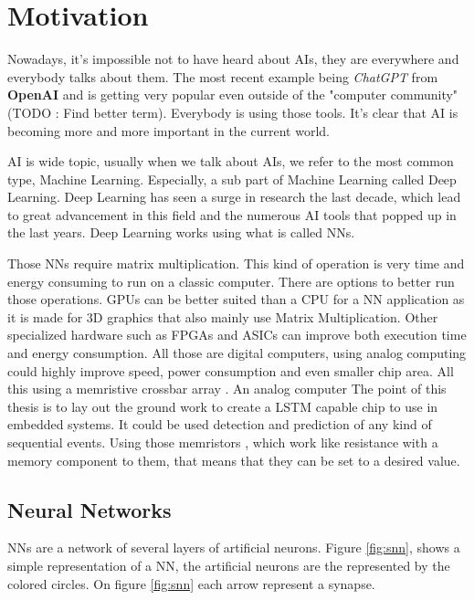 \section{Motivation}
\label{sec:int_motivation}

Nowadays, it's impossible not to have heard about \acp{AI}, they are everywhere and everybody talks about them. The most recent example being \textit{ChatGPT} from \textbf{OpenAI} and is getting very popular even outside of the "computer community"(TODO : Find better term). Everybody is using those tools. It's clear that \ac{AI} is becoming more and more important in the current world.

\ac{AI} is wide topic, usually when we talk about \acp{AI}, we refer to the most common type, Machine Learning. Especially, a sub part of Machine Learning called Deep Learning. Deep Learning has seen a surge in research the last decade, which lead to great advancement in this field and the numerous \ac{AI} tools that popped up in the last years.
Deep Learning works using what is called \acp{NN}.

Those \acp{NN} require matrix multiplication. This kind of operation is very time and energy consuming to run on a classic computer. There are options to better run those operations. GPUs can be better suited than a CPU for a \ac{NN} application as it is made for 3D graphics that also mainly use Matrix Multiplication. Other specialized hardware such as FPGAs and ASICs can improve both execution time and energy consumption. All those are digital computers, using analog computing could highly improve speed, power consumption and even smaller chip area. All this using a memristive crossbar array \cite{Xbar}. An analog computer
The point of this thesis is to lay out the ground work to create a LSTM capable chip to use in embedded systems. It could be used detection and prediction of any kind of sequential events.
Using those memristors \cite{TheoMemristor}, which work like resistance with a memory component to them, that means that they can be set to a desired value.

\subsection{Neural Networks}\label{sec:nn}

\acfp{NN} are a network of several layers of artificial neurons. Figure \ref{fig:snn}, shows a simple representation of a \ac{NN}, the artificial neurons are the represented by the colored circles. On figure \ref{fig:snn} each arrow represent a synapse.


